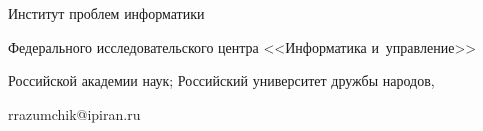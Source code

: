 \titel{\tit}{\aut}{\autkol}{\titkol}





\vspace*{-12pt}





\noindent


Институт проблем информатики


Федерального исследовательского центра <<Информатика и~управ\-ле\-ние>>


Российской академии наук; Российский университет дружбы народов,


\mbox{rrazumchik@ipiran.ru}





\vspace*{6pt}





\def\leftfootline{\small{\textbf{\thepage}


\hfill ИНФОРМАТИКА И ЕЁ ПРИМЕНЕНИЯ\ \ \ том\ 11\ \ \ выпуск\ 4\ \ \ 2017}


}%


 \def\rightfootline{\small{ИНФОРМАТИКА И ЕЁ ПРИМЕНЕНИЯ\ \ \ том\ 11\ \ \ выпуск\ 4\ \ \ 2017


\hfill \textbf{\thepage}}}








